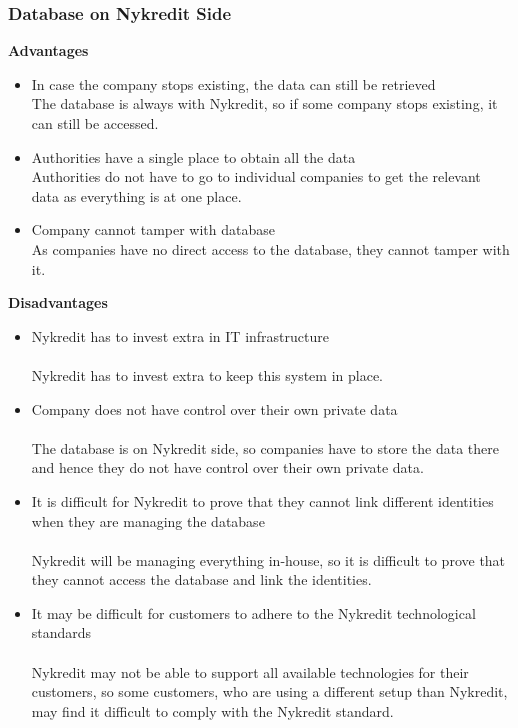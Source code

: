 \subsubsection{Database on Nykredit Side}
\textbf{Advantages}
\begin{itemize}
	\item In case the company stops existing, the data can still be retrieved
	\\The database is always with Nykredit, so if some company stops existing, it can still be accessed.
	\item Authorities have a single place to obtain all the data
	\\Authorities do not have to go to individual companies to get the relevant data as everything is at one place.
	\item Company cannot tamper with database
	\\As companies have no direct access to the database, they cannot tamper with it.
\end{itemize}
\textbf{Disadvantages}
\begin{itemize}
	\item Nykredit has to invest extra in IT infrastructure
	\\
	\\Nykredit has to invest extra to keep this system in place.
	\item Company does not have control over their own private data
	\\
	\\The database is on Nykredit side, so companies have to store the data there and hence they do not have control over their own private data.
	\item It is difficult for Nykredit to prove that they cannot link different identities when they are managing the database
	\\
	\\Nykredit will be managing everything in-house, so it is difficult to prove that they cannot access the database and link the identities.
	\item It may be difficult for customers to adhere to the Nykredit technological standards
	\\
	\\Nykredit may not be able to support all available technologies for their customers, so some customers, who are using a different setup than Nykredit, may find it difficult to comply with the Nykredit standard.
\end{itemize}
